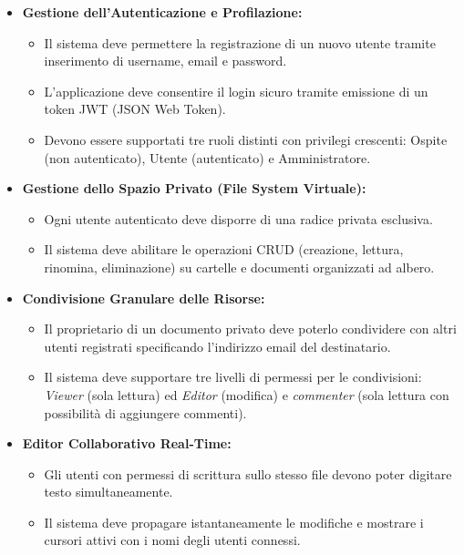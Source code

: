 \documentclass[11pt,a4paper]{report}
\begin{document}
\begin{itemize}
    \item \textbf{Gestione dell'Autenticazione e Profilazione:}
    \begin{itemize}
        \item Il sistema deve permettere la registrazione di un nuovo utente tramite inserimento di username, email e password.
        \item L'applicazione deve consentire il login sicuro tramite emissione di un token JWT (JSON Web Token).
        \item Devono essere supportati tre ruoli distinti con privilegi crescenti: Ospite (non autenticato), Utente (autenticato) e Amministratore.
    \end{itemize}
    
    \item \textbf{Gestione dello Spazio Privato (File System Virtuale):}
    \begin{itemize}
        \item Ogni utente autenticato deve disporre di una radice privata esclusiva.
        \item Il sistema deve abilitare le operazioni CRUD (creazione, lettura, rinomina, eliminazione) su cartelle e documenti organizzati ad albero.
    \end{itemize}
    
    \item \textbf{Condivisione Granulare delle Risorse:}
    \begin{itemize}
        \item Il proprietario di un documento privato deve poterlo condividere con altri utenti registrati specificando l'indirizzo email del destinatario.
        \item Il sistema deve supportare tre livelli di permessi per le condivisioni: \textit{Viewer} (sola lettura) ed \textit{Editor} (modifica) e \textit{commenter} (sola lettura con possibilità di aggiungere commenti).
    \end{itemize}
    
    \item \textbf{Editor Collaborativo Real-Time:}
    \begin{itemize}
        \item Gli utenti con permessi di scrittura sullo stesso file devono poter digitare testo simultaneamente.
        \item Il sistema deve propagare istantaneamente le modifiche e mostrare i cursori attivi con i nomi degli utenti connessi.
    \end{itemize}
    

\end{itemize}
\end{document}
